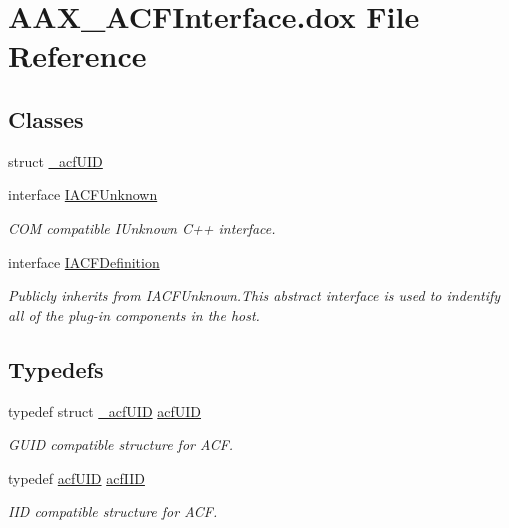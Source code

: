 \hypertarget{a00269}{}\section{A\+A\+X\+\_\+\+A\+C\+F\+Interface.\+dox File Reference}
\label{a00269}
\subsection*{Classes}
\begin{DoxyCompactItemize}
\item 
struct \mbox{\hyperlink{a01405}{\+\_\+acf\+U\+ID}}
\item 
interface \mbox{\hyperlink{a01409}{I\+A\+C\+F\+Unknown}}
\begin{DoxyCompactList}\small\item\em C\+OM compatible I\+Unknown C++ interface. \end{DoxyCompactList}\item 
interface \mbox{\hyperlink{a01413}{I\+A\+C\+F\+Definition}}
\begin{DoxyCompactList}\small\item\em Publicly inherits from I\+A\+C\+F\+Unknown.\+This abstract interface is used to indentify all of the plug-\/in components in the host. \end{DoxyCompactList}\end{DoxyCompactItemize}
\subsection*{Typedefs}
\begin{DoxyCompactItemize}
\item 
typedef struct \mbox{\hyperlink{a01405}{\+\_\+acf\+U\+ID}} \mbox{\hyperlink{a00269_ab19414382287ff80930c48a196145214}{acf\+U\+ID}}
\begin{DoxyCompactList}\small\item\em G\+U\+ID compatible structure for A\+CF. \end{DoxyCompactList}\item 
typedef \mbox{\hyperlink{a00269_ab19414382287ff80930c48a196145214}{acf\+U\+ID}} \mbox{\hyperlink{a00269_a59df0b41744eee7a066787aaedf97f67}{acf\+I\+ID}}
\begin{DoxyCompactList}\small\item\em I\+ID compatible structure for A\+CF. \end{DoxyCompactList}\end{DoxyCompactItemize}


